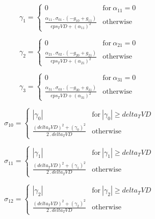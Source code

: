 \documentclass{article}
\begin{document}
\begin{dmath}\gamma_{1} = \begin{cases} 0 & \text{for}\: \alpha_{11} = 0 \\\frac{\alpha_{11} \,.\, \sigma_{0 1} \,.\, \left(- g_{10} + g_{11}\right)}{eps_TVD + \left(\alpha_{11} \right)^{2}} & \text{otherwise} \end{cases}\end{dmath}

\begin{dmath}\gamma_{2} = \begin{cases} 0 & \text{for}\: \alpha_{21} = 0 \\\frac{\alpha_{21} \,.\, \sigma_{0 2} \,.\, \left(- g_{20} + g_{21}\right)}{eps_TVD + \left(\alpha_{21} \right)^{2}} & \text{otherwise} \end{cases}\end{dmath}

\begin{dmath}\gamma_{3} = \begin{cases} 0 & \text{for}\: \alpha_{31} = 0 \\\frac{\alpha_{31} \,.\, \sigma_{0 3} \,.\, \left(- g_{30} + g_{31}\right)}{eps_TVD + \left(\alpha_{31} \right)^{2}} & \text{otherwise} \end{cases}\end{dmath}

\begin{dmath}\sigma_{1 0} = \begin{cases} \left|{\gamma_{0}}\right| & \text{for}\: \left|{\gamma_{0}}\right| \geq delta_TVD \\\frac{\left(delta_TVD \right)^{2} + \left(\gamma_{0} \right)^{2}}{2 \,.\, delta_TVD} & \text{otherwise} 
\end{cases}\end{dmath}

\begin{dmath}\sigma_{1 1} = \begin{cases} \left|{\gamma_{1}}\right| & \text{for}\: \left|{\gamma_{1}}\right| \geq delta_TVD \\\frac{\left(delta_TVD \right)^{2} + \left(\gamma_{1} \right)^{2}}{2 \,.\, delta_TVD} & \text{otherwise} 
\end{cases}\end{dmath}

\begin{dmath}\sigma_{1 2} = \begin{cases} \left|{\gamma_{2}}\right| & \text{for}\: \left|{\gamma_{2}}\right| \geq delta_TVD \\\frac{\left(delta_TVD \right)^{2} + \left(\gamma_{2} \right)^{2}}{2 \,.\, delta_TVD} & \text{otherwise} 
\end{cases}\end{dmath}
\end{document}
